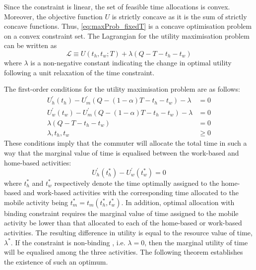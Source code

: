 \documentclass[12pt,a4paper,british]{article}
\begin{document}
Since the constraint is linear, the set of feasible time allocations is convex. Moreover, the objective function $U$ is strictly concave as it is the sum of strictly concave functions. Thus, \eqref{eq:maxProb_fixedT} is a concave optimisation problem on a convex constraint set. The Lagrangian for the utility maximisation problem can be written as
\begin{equation*}
\mathcal{L} \equiv U\left(t_{h},t_{w};T\right) + \lambda \left(Q - T - t_{h} - t_{w}\right)
\end{equation*}%
where $\lambda$ is a non-negative constant indicating the change in optimal utility following a unit relaxation of the time constraint.


The first-order conditions for the utility maximisation problem are as follows:
\begin{subequations}
\begin{align}
U_{h}^{\prime}\left(t_{h}\right)-U_{m}^{\prime}\left(Q-\left(1-\alpha\right)T-t_{h}-t_{w}\right)-\lambda & =0
\label{eq:foc_deterministic_th} \\
U_{w}^{\prime}\left(t_{w}\right)-U_{m}^{\prime}\left(Q-\left(1-\alpha\right)T-t_{h}-t_{w}\right)-\lambda & =0
\label{eq:foc_deterministic_tw} \\
\lambda\left(Q-T-t_{h}-t_{w}\right) & =0
\label{eq:foc_deterministic_lmd} \\
\lambda,t_{h},t_{w} & \geq 0
\label{eq:foc_deterministic_nonnega}
\end{align}\label{eq:foc_deterministic}
\end{subequations}
These conditions imply that the commuter will allocate the total time in such a way that the marginal value of time is equalised between the work-based and home-based activities:%
\begin{equation}
U_{h}^{\prime}\left(t_{h}^{\ast}\right)-U_{w}^{\prime}\left(t_{w}^{\ast}\right)=0\label{eq:Uh_eq_Uw}
\end{equation}%
where $t_{h}^{\ast}$ and $t_{w}^{\ast}$ respectively denote the time optimally assigned to the home-based and work-based activities with the corresponding time allocated to the mobile activity being $t_{m}^{\ast}=t_{m}\left(t_{h}^{\ast},t_{w}^{\ast}\right)$. In addition, optimal allocation with binding constraint requires the marginal value of time assigned to the mobile activity be lower than that allocated to each of the home-based or work-based activities. The resulting difference in utility is equal to the resource value of time, $\lambda^{\ast}$. If the constraint is non-binding , i.e. $\lambda=0$, then the marginal utility of time will be equalised among the three activities. The following theorem establishes the existence of such an optimum.
\end{document}
